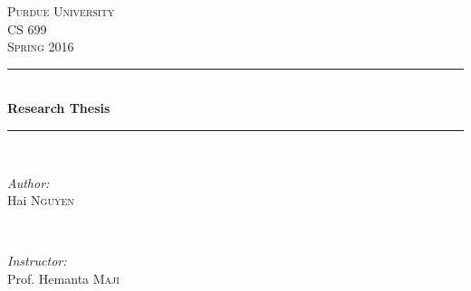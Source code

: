 \begin{titlepage}

\newcommand{\HRule}{\rule{\linewidth}{0.5mm}} %

\center %
 

\textsc{\LARGE Purdue University}\\[1.5cm] %
\textsc{\Large CS 699}\\[0.5cm] %
\textsc{\large Spring 2016}\\[0.5cm] %


\HRule \\[0.4cm]
{ \huge \bfseries Research Thesis}\\[0.4cm] %
\HRule \\[1.5cm]
 

\begin{minipage}{0.4\textwidth}
\begin{flushleft} \large
\emph{Author:}\\
Hai \textsc{Nguyen} %
\end{flushleft}
\end{minipage}
~
\begin{minipage}{0.4\textwidth}
\begin{flushright} \large
\emph{Instructor:} \\
Prof. Hemanta \textsc{Maji} %
\end{flushright}
\end{minipage}\\[4cm]



\end{titlepage}
